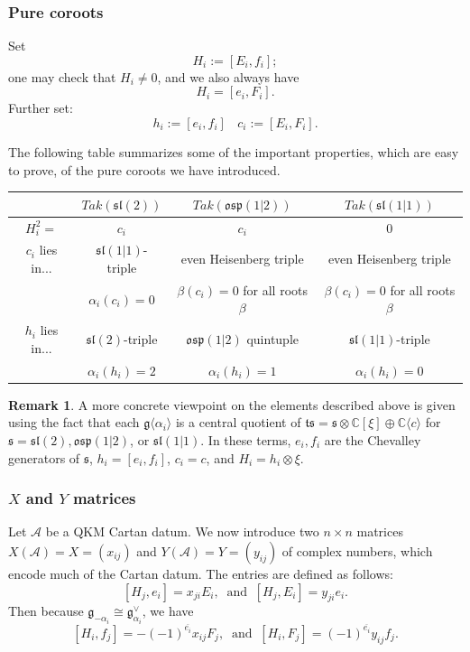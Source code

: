 \documentclass[12pt, a4paper, reqno]{amsart}
\def\C{\mathbb{C}}
\def\AA{\mathcal{A}}
\def\p{\mathfrak{p}}
\def\g{\mathfrak{g}}
\def\l{\mathfrak{l}}
\def\s{\mathfrak{s}}
\def\o{\mathfrak{o}}
\def\ol{\overline}
\theoremstyle{definition}
\theoremstyle{definition}
\newtheorem{remark}{Remark}
\theoremstyle{definition}
\numberwithin{theorem}{section}
\numberwithin{lemma}{section}
\numberwithin{remark}{section}
\numberwithin{definition}{section}
\numberwithin{corollary}{section}
\numberwithin{proposition}{section}
\numberwithin{example}{section}
\begin{document}
	\subsubsection{Pure coroots} Set 
	\[
	H_i:=[E_i,f_i];
	\]
	one may check that $H_i\neq0$, and we also always have 
	\[
	H_i=[e_i,F_i].
	\]
	Further set:
	\[
	h_i:=[e_i,f_i] \ \ \ \ c_i:=[E_i,F_i].
	\]
	
	The following table summarizes some of the important properties, which are easy to prove, of the pure coroots we have introduced.
	\begin{center}
		\begin{tabular}{|c|c|c|c|}
			\hline
			& $Tak(\s\l(2))$ & $Tak(\o\s\p(1|2))$ & $Tak(\s\l(1|1))$\\
			\hline
			$H_i^2=$ & $c_i$ & $c_i$ & 0\\
			\hline 
			$c_i$ lies in... & $\s\l(1|1)$-triple & even Heisenberg triple & even Heisenberg triple\\
			& $\alpha_i(c_i)=0$ & $\beta(c_i)=0$ for all roots $\beta$ & $\beta(c_i)=0$ for all roots $\beta$\\
			\hline
			$h_i$ lies in... & $\s\l(2)$-triple & $\o\s\p(1|2)$ quintuple & $\s\l(1|1)$-triple\\
			& $\alpha_i(h_i)=2$ & $\alpha_i(h_i)=1$ & $\alpha_i(h_i)=0$\\
			\hline
		\end{tabular}	
	\end{center}
	
	\begin{remark}\label{remark_root_subalg_really_takiff}
		A more concrete viewpoint on the elements described above is given using the fact that each $\g\langle\alpha_i\rangle$ is a central quotient of $\mathfrak{t}\s=\s\otimes\C[\xi]\oplus\C\langle c\rangle$ for $\s=\s\l(2),\o\s\p(1|2)$, or $\s\l(1|1)$.  In these terms, $e_i,f_i$ are the Chevalley generators of $\s$, $h_i=[e_i,f_i]$, $c_i=c$, and $H_i=h_i\otimes \xi$.  
	\end{remark}
	
	\subsubsection{$X$ and $Y$ matrices}\label{section_X_Y_matrices}
	
	Let $\AA$ be a QKM Cartan datum.  We now introduce two $n\times n$ matrices $X(\AA)=X=(x_{ij})$ and $Y(\AA)=Y=(y_{ij})$ of complex numbers, which encode much of the Cartan datum. The entries are defined as follows:
		\[
		[H_j,e_i]=x_{ji}E_i, \ \text{ and } \ [H_j,E_i]=y_{ji}e_i.
		\]
		Then because $\g_{-\alpha_i}\cong\g_{\alpha_i}^\vee$, we have
		\[
		[H_i,f_j]=-(-1)^{\ol{e_i}}x_{ij}F_j, \ \text{ and } \ [H_i,F_j]=(-1)^{\ol{e_i}}y_{ij}f_j.
		\]
	
\end{document}
